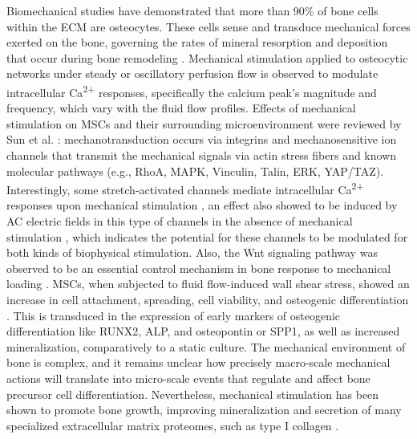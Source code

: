 Biomechanical studies have demonstrated that more than 90\% of bone cells within the \ac{ECM} are osteocytes. These cells sense and transduce mechanical forces exerted on the bone, governing the rates of mineral resorption and deposition that occur during bone remodeling \cite{Franz-Odendaal2006-eu}. Mechanical stimulation applied to osteocytic networks under steady or oscillatory perfusion flow \cite{Lu2012-vh} is observed to modulate intracellular Ca\textsuperscript{2+} responses, specifically the calcium peak's magnitude and frequency, which vary with the fluid flow profiles. Effects of mechanical stimulation on \ac{MSCs} and their surrounding microenvironment were reviewed by Sun et al. \cite{Sun2022-xt}: mechanotransduction occurs via integrins and mechanosensitive ion channels that transmit the mechanical signals via actin stress fibers and known molecular pathways (e.g., RhoA, MAPK, Vinculin, Talin, ERK, YAP/TAZ). Interestingly, some stretch-activated channels mediate intracellular Ca\textsuperscript{2+} responses upon mechanical stimulation \cite{Walker2000-bc, Luo2013-wv}, an effect also showed to be induced by \acs{AC} electric fields in this type of channels in the absence of mechanical stimulation \cite{Cho1999-hr}, which indicates the potential for these channels to be modulated for both kinds of biophysical stimulation. Also, the Wnt signaling pathway was observed to be an essential control mechanism in bone response to mechanical loading \cite{Choi2021-jk}. \ac{MSCs}, when subjected to fluid flow-induced wall shear stress, showed an increase in cell attachment, spreading, cell viability, and osteogenic differentiation \cite{De_Luca2020-hp}. This is transduced in the expression of early markers of osteogenic differentiation like \acs{RUNX2}, \ac{ALP}, and osteopontin or \ac{SPP1}, as well as increased mineralization, comparatively to a static culture. The mechanical environment of bone is complex, and it remains unclear how precisely macro-scale mechanical actions will translate into micro-scale events that regulate and affect bone precursor cell differentiation. Nevertheless, mechanical stimulation has been shown to promote bone growth, improving mineralization and secretion of many specialized extracellular matrix proteomes, such as type I collagen \cite{Partap2010-xt}.



